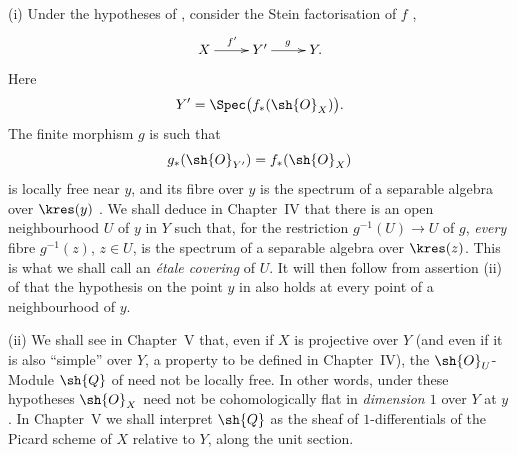 \begin{remarks}[7.8.10]
\label{III.7.8.10}
\textnormal{(i)}
Under the hypotheses of , consider the
Stein factorisation of $f$ ,
\[
  \xymatrix{
    X \ar[r]^{f'} & Y' \ar[r]^{g} & Y .
  }
\]
Here
\[
  Y'=\Spec\bigl(f_*(\sh{O}_X)\bigr).
\]
The finite morphism $g$ is such that
\[
  g_*(\sh{O}_{Y'})=f_*(\sh{O}_X)
\]
is locally free near $y$, and its fibre over $y$ is the
spectrum of a separable algebra over $\kres(y)$
.  We shall deduce in Chapter~IV that
there is an open neighbourhood $U$ of $y$ in $Y$ such that,
for the restriction $g^{-1}(U)\to U$ of $g$, \emph{every}
fibre $g^{-1}(z)$, $z\in U$, is the spectrum of a separable
algebra over $\kres(z)$.  This is what we shall call an
\emph{\'etale covering} of $U$.  It will then follow from
assertion (ii) of  that the hypothesis on
the point $y$ in  also holds at every point
of a neighbourhood of $y$.

\medskip
\textnormal{(ii)}
We shall see in Chapter~V that, even if $X$ is projective
over $Y$ (and even if it is also ``simple'' over $Y$, a
property to be defined in Chapter~IV), the
$\sh{O}_U$-Module $\sh{Q}$ of  need not be
locally free.  In other words, under these hypotheses
$\sh{O}_X$ need not be cohomologically flat in
\emph{dimension $1$} over $Y$ at $y$.  In Chapter~V we
shall interpret $\sh{Q}$ as the sheaf of
$1$-differentials of the Picard scheme of $X$ relative to
$Y$, along the unit section.
\end{remarks}

